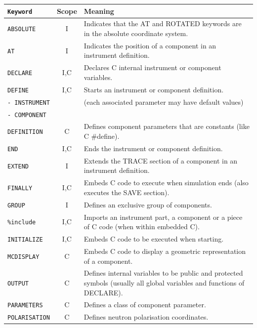 \begin{table}
  \begin{center}
    {\let\my=\\
    \begin{tabular}{|l|c|p{}|}
      \hline
      \texttt{Keyword} & Scope & Meaning \\
      \hline
      \texttt{ABSOLUTE} & I & Indicates that the AT and ROTATED keywords are in the absolute coordinate system. \\
      \texttt{AT} & I & Indicates the position of a component in an instrument definition. \\
      \texttt{DECLARE} & I,C & Declares C internal instrument or component variables. \\
      \texttt{DEFINE} & I,C & Starts an instrument or component definition. \\
      \texttt{- INSTRUMENT} & & (each associated parameter may have default values) \\
      \texttt{- COMPONENT} & & \\
      \texttt{DEFINITION} & C & Defines component parameters that are constants (like C \#define). \\
      \texttt{END} & I,C & Ends the instrument or component definition. \\
      \texttt{EXTEND} & I & Extends the TRACE section of a component in an instrument definition. \\
      \texttt{FINALLY} & I,C & Embeds C code to execute when simulation ends (also executes the SAVE section). \\
      \texttt{GROUP} & I & Defines an exclusive group of components. \\
      \texttt{\%include} & I,C & Imports an instrument part, a component or a piece of C code (when within embedded C). \\
      \texttt{INITIALIZE} & I,C & Embeds C code to be executed when starting. \\
      \texttt{MCDISPLAY} & C & Embeds C code to display a geometric  representation of a component. \\
      \texttt{OUTPUT} & C & Defines internal variables to be public and protected symbols (usually all global variables and functions of DECLARE).\\
      \texttt{PARAMETERS} & C & Defines a class of component parameter. \\
      \texttt{POLARISATION} & C & Defines neutron polarisation coordinates. \\

\end{tabular}}
\end{center}
\end{table}
